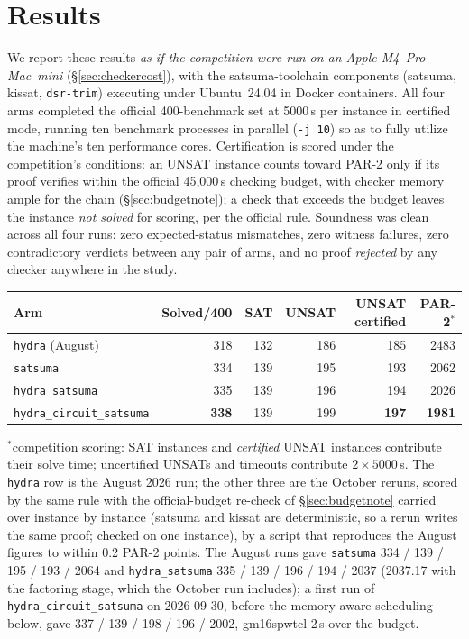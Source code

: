\documentclass[10pt]{article}
\begin{document}
\section{Results}
\label{sec:results}

We report these results \emph{as if the competition were run on an
Apple M4~Pro Mac~mini} (\S\ref{sec:checkercost}), with
the satsuma-toolchain components (satsuma, kissat, \texttt{dsr-trim})
executing under Ubuntu~24.04 in Docker containers. All four arms
completed the official 400-benchmark set at 5000\,s per instance in
certified mode, running ten benchmark processes in parallel
(\texttt{-j 10}) so as to fully utilize the machine's ten
performance cores. Certification is scored under
the competition's conditions: an UNSAT instance counts toward PAR-2
only if its proof verifies within the official 45{,}000\,s checking
budget, with checker memory ample for the chain
(\S\ref{sec:budgetnote}); a check that exceeds the budget leaves the
instance \emph{not solved} for scoring, per the official rule.
Soundness was clean across all four runs: zero expected-status
mismatches, zero witness failures, zero contradictory verdicts
between any pair of arms, and no proof \emph{rejected} by any
checker anywhere in the study.

\begin{center}
\begin{tabular}{@{}lrrrrr@{}}
\toprule
Arm & Solved/400 & SAT & UNSAT & UNSAT certified & PAR-2$^{\ast}$ \\
\midrule
\texttt{hydra} (August) & 318 & 132 & 186 & 185 & 2483 \\
\texttt{satsuma} & 334 & 139 & 195 & 193 & 2062 \\
\texttt{hydra\_satsuma} & 335 & 139 & 196 & 194 & 2026 \\
\texttt{hydra\_circuit\_satsuma} & \textbf{338} & 139 & 199 & \textbf{197} & \textbf{1981} \\
\bottomrule
\end{tabular}

{\footnotesize $^{\ast}$competition scoring: SAT instances and
\emph{certified} UNSAT instances contribute their solve time;
uncertified UNSATs and timeouts contribute $2\times 5000$\,s. The
\texttt{hydra} row is the August 2026 run; the other three are the
October reruns, scored by the same rule with the official-budget
re-check of \S\ref{sec:budgetnote} carried over instance by instance
(satsuma and kissat are deterministic, so a rerun writes the same
proof; checked on one instance), by a script that reproduces the
August figures to within 0.2 PAR-2 points. The August runs gave
\texttt{satsuma} 334 / 139 / 195 / 193 / 2064 and
\texttt{hydra\_satsuma} 335 / 139 / 196 / 194 / 2037 (2037.17 with the
factoring stage, which the October run includes); a first run of
\texttt{hydra\_circuit\_satsuma} on 2026-09-30, before the
memory-aware scheduling below, gave 337 / 139 / 198 / 196 / 2002,
gm16spwtcl 2\,s over the budget.}
\end{center}
\end{document}
